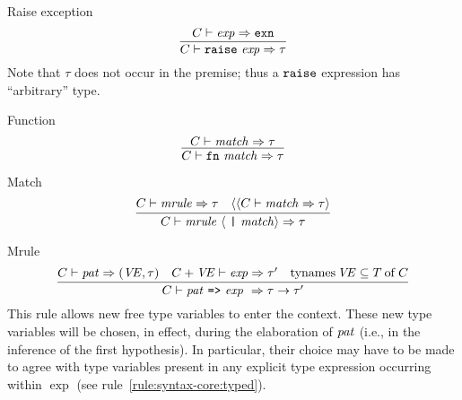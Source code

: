 \begin{inference-rule}{Raise exception}
\begin{equation}\label{rule:syntax-core:raise-exception}
\vcenter{\infer{\C\ts\raisexp\ra\tau}{\C\ts\exp\ra\EXCN}}
\end{equation}
Note that $\tau$ does not occur in the premise; thus a ${\tt raise}$
expression has ``arbitrary'' type.
\end{inference-rule}

\begin{inference-rule}{Function}
\begin{equation}\label{rule:syntax-core:function}
\vcenter{\infer{\C\ts\fnexp\ra\tau}{\C\ts\match\ra\tau}}
\end{equation}
\end{inference-rule}


\begin{inference-rule}{Match}
\begin{equation}\label{rule:syntax-core:match}
  \vcenter{\infer{\C\ts\longmatch\ra\tau}
    {\C\ts\mrule\ra\tau
      & \optional{\langle\C\ts\match\ra\tau}}}
\end{equation}
\end{inference-rule}


\begin{inference-rule}{Mrule}
\begin{equation}\label{rule:syntax-core:mrule}
  \vcenter{\infer{\C\ts\longmrule\ \ra\tau\rightarrow\tau'}
    {\C\ts\pat\ra(\VE,\tau)
      & \C+\VE\ts\exp\ra\tau'
      & \TyNamesFcn\VE\subseteq\of{\T}{\C}}}
\end{equation}
This rule allows new free type variables to enter
the context. These new type variables will be chosen, in effect, during
the elaboration of $\textit{pat\/}$ (i.e., in the inference of the first
hypothesis). In particular, their choice may have to be made to
agree with type variables present in any explicit type expression
occurring within $\exp$ (see rule~\ref{rule:syntax-core:typed}).
\end{inference-rule}


